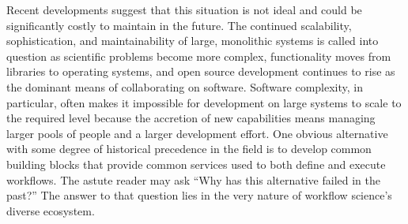 Recent developments suggest that this situation is not ideal and could be
significantly costly to maintain in the future. The continued scalability,
sophistication, and maintainability of large, monolithic systems is called into
question as scientific problems become more complex, functionality moves from
libraries to operating systems, and open source development continues to rise
as the dominant means of collaborating on software. Software complexity, in
particular, often makes it impossible for development on large systems to scale
to the required level because the accretion of new capabilities means managing
larger pools of people and a larger development effort. One obvious
alternative with some degree of historical precedence in the field is to
develop common building blocks that provide common services used to both define
and execute workflows. The astute reader may ask ``Why has this alternative
failed in the past?'' The answer to that question lies in the very nature of
workflow science's diverse ecosystem. 

